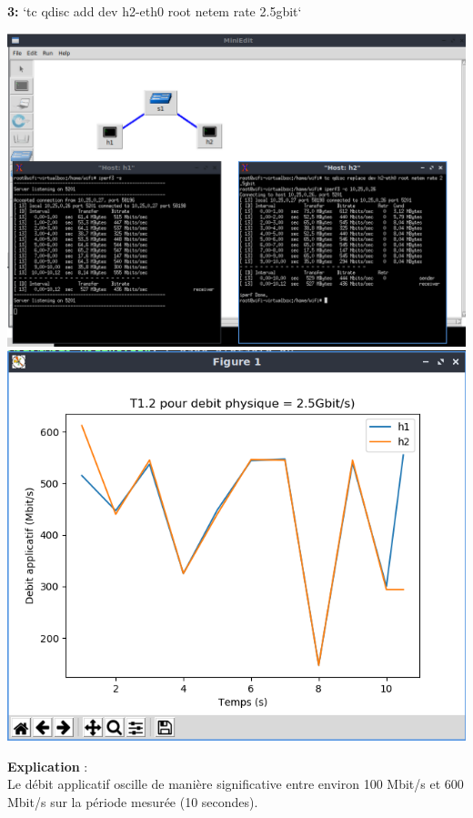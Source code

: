\vspace{1cm}
\\
\newpage
\textbf{3:} `tc qdisc add dev h2-eth0 root netem rate 2.5gbit`
\begin{center}
    \includegraphics[width=1\textwidth]{./images/T1.2/2500test2.png}
    \includegraphics[width=1\textwidth]{./images/T1.2/courbe2500test2.png}
\end{center}
\textbf{Explication} :\\
Le débit applicatif oscille de manière significative entre environ 100 Mbit/s et 600 Mbit/s sur la période mesurée (10 secondes).
\\

